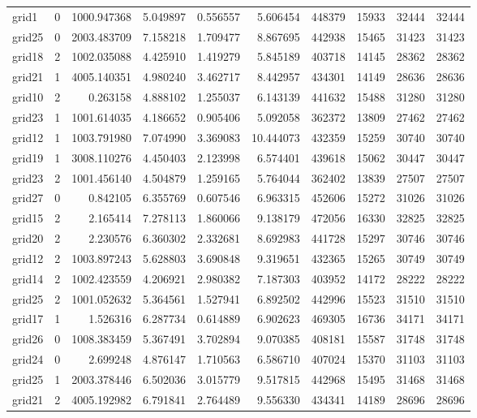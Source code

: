 \begin{longtable}{|l|r|r|r|r|r|r|r|r|r|}
grid1 & 0 & 1000.947368 & 5.049897 & 0.556557 & 5.606454 & 448379 & 15933 & 32444 & 32444 \\
grid25 & 0 & 2003.483709 & 7.158218 & 1.709477 & 8.867695 & 442938 & 15465 & 31423 & 31423 \\
grid18 & 2 & 1002.035088 & 4.425910 & 1.419279 & 5.845189 & 403718 & 14145 & 28362 & 28362 \\
grid21 & 1 & 4005.140351 & 4.980240 & 3.462717 & 8.442957 & 434301 & 14149 & 28636 & 28636 \\
grid10 & 2 & 0.263158 & 4.888102 & 1.255037 & 6.143139 & 441632 & 15488 & 31280 & 31280 \\
grid23 & 1 & 1001.614035 & 4.186652 & 0.905406 & 5.092058 & 362372 & 13809 & 27462 & 27462 \\
grid12 & 1 & 1003.791980 & 7.074990 & 3.369083 & 10.444073 & 432359 & 15259 & 30740 & 30740 \\
grid19 & 1 & 3008.110276 & 4.450403 & 2.123998 & 6.574401 & 439618 & 15062 & 30447 & 30447 \\
grid23 & 2 & 1001.456140 & 4.504879 & 1.259165 & 5.764044 & 362402 & 13839 & 27507 & 27507 \\
grid27 & 0 & 0.842105 & 6.355769 & 0.607546 & 6.963315 & 452606 & 15272 & 31026 & 31026 \\
grid15 & 2 & 2.165414 & 7.278113 & 1.860066 & 9.138179 & 472056 & 16330 & 32825 & 32825 \\
grid20 & 2 & 2.230576 & 6.360302 & 2.332681 & 8.692983 & 441728 & 15297 & 30746 & 30746 \\
grid12 & 2 & 1003.897243 & 5.628803 & 3.690848 & 9.319651 & 432365 & 15265 & 30749 & 30749 \\
grid14 & 2 & 1002.423559 & 4.206921 & 2.980382 & 7.187303 & 403952 & 14172 & 28222 & 28222 \\
grid25 & 2 & 1001.052632 & 5.364561 & 1.527941 & 6.892502 & 442996 & 15523 & 31510 & 31510 \\
grid17 & 1 & 1.526316 & 6.287734 & 0.614889 & 6.902623 & 469305 & 16736 & 34171 & 34171 \\
grid26 & 0 & 1008.383459 & 5.367491 & 3.702894 & 9.070385 & 408181 & 15587 & 31748 & 31748 \\
grid24 & 0 & 2.699248 & 4.876147 & 1.710563 & 6.586710 & 407024 & 15370 & 31103 & 31103 \\
grid25 & 1 & 2003.378446 & 6.502036 & 3.015779 & 9.517815 & 442968 & 15495 & 31468 & 31468 \\
grid21 & 2 & 4005.192982 & 6.791841 & 2.764489 & 9.556330 & 434341 & 14189 & 28696 & 28696 \\

\end{longtable}
